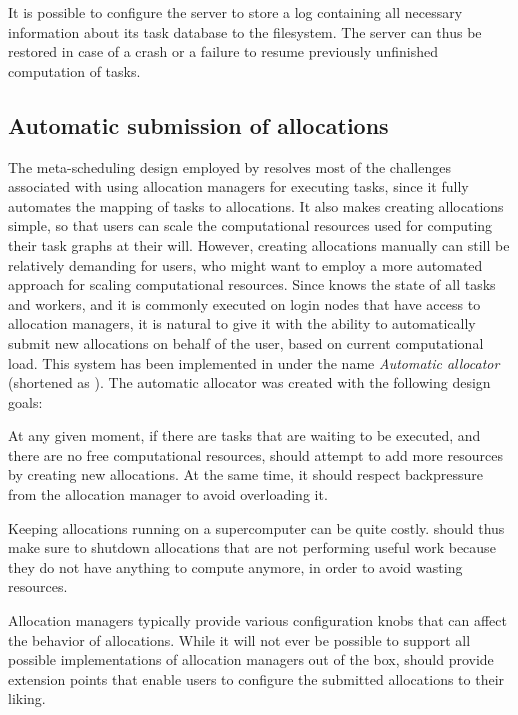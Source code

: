 It is possible to configure the server to store a log containing all necessary information about
its task database to the filesystem. The server can thus be restored in case of a crash or a
failure to resume previously unfinished computation of tasks.

\subsection{Automatic submission of allocations}
\label{hq:automatic-allocation}
The meta-scheduling design employed by \hyperqueue{} resolves most of the challenges
associated with using allocation managers for executing tasks, since it fully automates the mapping
of tasks to allocations. It also makes creating allocations simple, so that users can scale the
computational resources used for computing their task graphs at their will. However, creating
allocations manually can still be relatively demanding for users, who might want to employ a more
automated approach for scaling computational resources. Since \hyperqueue{} knows the
state of all tasks and workers, and it is commonly executed on login nodes that have access to
allocation managers, it is natural to give it with the ability to automatically submit new
allocations on behalf of the user, based on current computational load. This system has been
implemented in \hq{} under the name \emph{Automatic allocator} (shortened as \autoalloc{}). The automatic
allocator was created with the following design goals:

\begin{description}[wide=0pt]
	\item[Allow computational resources to scale up] At any given moment, if there are tasks that are waiting to be executed, and there are no free
		computational resources, \autoalloc{} should attempt to add more resources by creating
		new allocations. At the same time, it should respect backpressure from the allocation manager to
		avoid overloading it.
	\item[Allow computational resources to scale down] Keeping allocations running on a supercomputer can be quite costly. \Autoalloc{} should
		thus make sure to shutdown allocations that are not performing useful work because they do not have
		anything to compute anymore, in order to avoid wasting resources.
	\item[Be flexible] Allocation managers typically provide various configuration knobs that can affect the behavior of
		allocations. While it will not ever be possible to support all possible implementations of
		allocation managers out of the box, \autoalloc{} should provide extension points that
		enable users to configure the submitted allocations to their liking.
\end{description}

